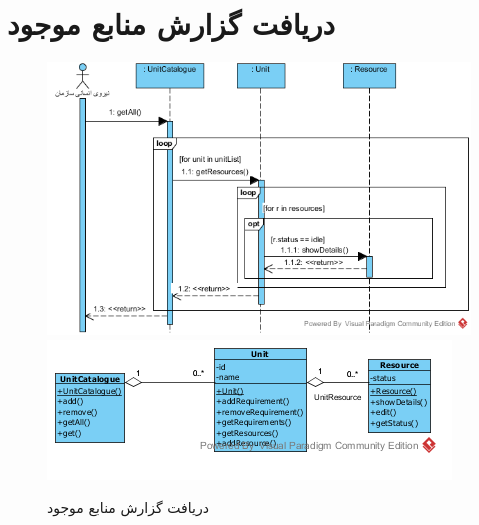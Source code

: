 \section{دریافت گزارش منابع موجود}
\begin{figure}[H]
	\centering
	\includegraphics[scale=0.65]{img/sequence-analysis/AvailableResourcesReport}
	\includegraphics[scale=0.65]{img/sequence-analysis/AvailableResourcesReportC}
	\caption{دریافت گزارش منابع موجود}
\end{figure}


